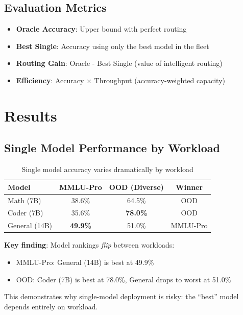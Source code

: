\documentclass[11pt,a4paper]{article}
\begin{document}
\subsection{Evaluation Metrics}

\begin{itemize}
    \item \textbf{Oracle Accuracy}: Upper bound with perfect routing
    \item \textbf{Best Single}: Accuracy using only the best model in the fleet
    \item \textbf{Routing Gain}: Oracle - Best Single (value of intelligent routing)
    \item \textbf{Efficiency}: Accuracy $\times$ Throughput (accuracy-weighted capacity)
\end{itemize}

\section{Results}

\subsection{Single Model Performance by Workload}

\begin{table}[h]
\centering
\caption{Single model accuracy varies dramatically by workload}
\label{tab:single_model}
\begin{tabular}{lccc}
\toprule
\textbf{Model} & \textbf{MMLU-Pro} & \textbf{OOD (Diverse)} & \textbf{Winner} \\
\midrule
Math (7B) & 38.6\% & 64.5\% & OOD \\
Coder (7B) & 35.6\% & \textbf{78.0\%} & OOD \\
General (14B) & \textbf{49.9\%} & 51.0\% & MMLU-Pro \\
\bottomrule
\end{tabular}
\end{table}

\textbf{Key finding}: Model rankings \emph{flip} between workloads:
\begin{itemize}
    \item MMLU-Pro: General (14B) is best at 49.9\%
    \item OOD: Coder (7B) is best at 78.0\%, General drops to worst at 51.0\%
\end{itemize}

This demonstrates why single-model deployment is risky: the ``best'' model depends entirely on workload.
\end{document}
